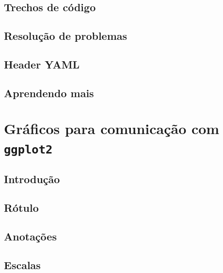 \documentclass[
]{latex/krantz}
\theoremstyle{definition}
\theoremstyle{definition}
\theoremstyle{definition}
\theoremstyle{definition}
\theoremstyle{remark}
\begin{document}
\hypertarget{trechos-de-cuxf3digo}{%
\section{Trechos de código}\label{trechos-de-cuxf3digo}}

\hypertarget{resoluuxe7uxe3o-de-problemas}{%
\section{Resolução de problemas}\label{resoluuxe7uxe3o-de-problemas}}

\hypertarget{header-yaml}{%
\section{Header YAML}\label{header-yaml}}

\hypertarget{aprendendo-mais-1}{%
\section{Aprendendo mais}\label{aprendendo-mais-1}}

\hypertarget{gruxe1ficos-para-comunicauxe7uxe3o-com-ggplot2}{%
\chapter{\texorpdfstring{Gráficos para comunicação com \texttt{ggplot2}}{Gráficos para comunicação com ggplot2}}\label{gruxe1ficos-para-comunicauxe7uxe3o-com-ggplot2}}

\hypertarget{introduuxe7uxe3o-18}{%
\section{Introdução}\label{introduuxe7uxe3o-18}}

\hypertarget{ruxf3tulo}{%
\section{Rótulo}\label{ruxf3tulo}}

\hypertarget{anotauxe7uxf5es}{%
\section{Anotações}\label{anotauxe7uxf5es}}

\hypertarget{escalas}{%
\section{Escalas}\label{escalas}}
\end{document}
